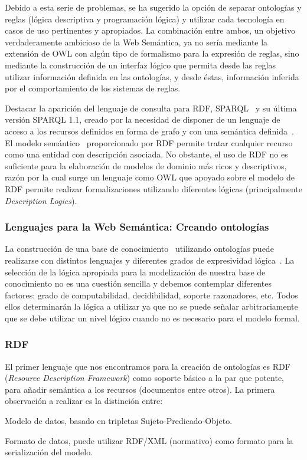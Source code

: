 Debido a esta serie de problemas, se ha sugerido la opción de separar ontologías y
reglas (lógica descriptiva y programación lógica) y utilizar cada tecnología en casos
de uso pertinentes y apropiados. La combinación entre ambos, un objetivo verdaderamente ambicioso de la Web Semántica, 
ya no sería mediante la extensión de OWL con algún tipo de formalismo para la expresión de reglas, sino mediante la construcción
de un interfaz lógico que permita desde las reglas utilizar información definida
en las ontologías, y desde éstas, información inferida por el
comportamiento de los sistemas de reglas.

Destacar la aparición del lenguaje de consulta para RDF, \gls{SPARQL}~\cite{Sparql} y su última
versión SPARQL 1.1, creado por la necesidad de disponer de un lenguaje de acceso a los recursos
definidos en forma de grafo y con una semántica definida~\cite{Perez:2009:SCS:1567274.1567278}. El modelo semántico~\cite{citeulike:1556975} 
proporcionado por RDF permite tratar cualquier recurso como una entidad con descripción asociada. No obstante, el uso de RDF no es
suficiente para la elaboración de modelos de dominio más ricos y descriptivos, razón por la cual surge un lenguaje como OWL que apoyado sobre el modelo de RDF
permite realizar formalizaciones utilizando diferentes lógicas (principalmente \textit{Description Logics}).

\subsubsection{Lenguajes para la Web Semántica: Creando ontologías}\label{lenguajes}
La construcción de una base de conocimiento~\cite{GruberOnto} utilizando ontologías puede
realizarse con distintos lenguajes y diferentes grados de expresividad lógica~\cite{HoPa10a,Kifer:1989:FHL:66926.66939}.
La selección de la lógica apropiada para la modelización de nuestra base de
conocimiento no es una cuestión sencilla y debemos contemplar diferentes
factores: grado de computabilidad, decidibilidad, soporte razonadores, etc.
Todos ellos determinarán la lógica a utilizar ya que no se puede señalar arbitrariamente que se debe utilizar un nivel lógico cuando no es necesario para
el modelo formal.
\subsubsection{RDF}\label{rdf}
El primer lenguaje que nos encontramos para la creación de ontologías es \gls{RDF}
(\textit{Resource Description Framework}) como soporte básico a la par que potente, 
para añadir semántica a los recursos (documentos entre otros). La primera observación 
a realizar es la distinción entre: \begin{inparaenum}\item Modelo de datos, basado en
tripletas Sujeto-Predicado-Objeto. \item Formato de datos, puede utilizar RDF/XML (normativo)
como formato para la serialización del modelo.\end{inparaenum}

